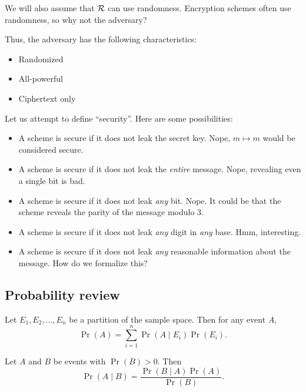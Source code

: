 We will also assume that $\mathcal{R}$ can use randomness.
Encryption schemes often use randomness, so why not the adversary?

Thus, the adversary has the following characteristics:
\begin{itemize}
    \item Randomized
    \item All-powerful
    \item Ciphertext only
\end{itemize}

Let us attempt to define ``security''.
Here are some possibilities:
\begin{itemize}
    \item A scheme is secure if it does not leak the secret key.
        Nope, $m \mapsto m$ would be considered secure.
    \item A scheme is secure if it does not leak the \emph{entire} message.
        Nope, revealing even a single bit is bad.
    \item A scheme is secure if it does not leak \emph{any} bit.
        Nope. It could be that the scheme reveals the parity of the message
        modulo $3$.
    \item A scheme is secure if it does not leak \emph{any} digit in
        \emph{any} base.
        Hmm, interesting.
    \item A scheme is secure if it does not leak \emph{any} reasonable
        information about the message.
        How do we formalize this?
\end{itemize}

\subsection{Probability review} \label{sec:prob-review}
\begin{theorem} \label{thm:prob-review:lotp}
    Let $E_1, E_2, \dots, E_n$ be a partition of the sample space.
    Then for any event $A$, \[
        \Pr(A) = \sum_{i=1}^n \Pr(A \mid E_i) \Pr(E_i).
    \]
\end{theorem}

\begin{theorem} \label{thm:prob-review:bayes}
    Let $A$ and $B$ be events with $\Pr(B) > 0$.
    Then \[
        \Pr(A \mid B) = \frac{\Pr(B \mid A) \Pr(A)}{\Pr(B)}.
    \]
\end{theorem}


